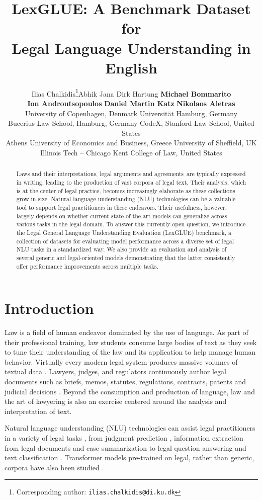 \documentclass[11pt]{article}
\title{LexGLUE: A Benchmark Dataset for\\ Legal Language Understanding in English}
\author{Ilias Chalkidis\thanks{\;\;Corresponding author: \texttt{ilias.chalkidis@di.ku.dk}}\qquad Abhik Jana \qquad Dirk Hartung \qquad \textbf{Michael Bommarito} \\ 
\textbf{Ion Androutsopoulos} \qquad \textbf{Daniel Martin Katz} \qquad \textbf{Nikolaos Aletras} \\
University of Copenhagen, Denmark \qquad 
Universität Hamburg, Germany \\
 Bucerius Law School, Hamburg, Germany \qquad
 CodeX, Stanford Law School, United States \\
 Athens University of Economics and Business, Greece \qquad
 University of Sheffield, UK \\
 Illinois Tech – Chicago Kent College of Law, United States \\
}
\date{}
\begin{document}
\maketitle
\begin{abstract}

Laws and their interpretations, legal arguments and agreements\ are typically expressed in writing, leading to the production of vast corpora of legal text. Their analysis, which is at the center of legal practice, becomes increasingly elaborate as these collections grow in size. Natural language understanding (NLU) technologies can be a valuable tool to support legal practitioners in these endeavors. Their usefulness, however, largely depends on whether current state-of-the-art models can generalize across various tasks in the legal domain. To answer this currently open question, we introduce the Legal General Language Understanding Evaluation (LexGLUE) benchmark, a collection of datasets for evaluating model performance across a diverse set of legal NLU tasks in a standardized way. We also provide an evaluation and analysis of several generic and legal-oriented models demonstrating that the latter consistently offer performance improvements across multiple tasks.
\end{abstract}

\section{Introduction}

Law is a field of human endeavor dominated by the use of language. As part of their professional training, law students consume large bodies of text as they seek to tune their understanding of the law and its application to help manage human behavior. Virtually every modern legal system produces massive volumes of textual data \cite{katz2020}.  Lawyers, judges, and regulators continuously author legal documents such as briefs, memos, statutes, regulations, contracts, patents and judicial decisions \cite{coupette2021}.  Beyond the consumption and production of language, law and the art of lawyering is also an exercise centered around the analysis and interpretation of text. 

Natural language understanding (NLU) technologies can assist legal practitioners in a variety of legal tasks \cite{chalkidis2018deep,aletras2019proceedings, aletras2020proceedings,zhong2020does,bommarito2021Lex}, from judgment prediction \cite{aletras2016predicting,sim-etal-2016-friends,katz2017general,Zhong2018,chalkidis-etal-2019-neural,Malik2021}, information extraction from legal documents \cite{chalkidis-etal-2018-obligation,Chalkidis2019neurips,chen-etal-2020-joint-entity,Hendrycks2021CUAD} and case summarization \cite{Bhattacharya2019} to legal question answering \cite{ravichander-etal-2019-question,kien-etal-2020-answering,Zhong_2020_Iteratively,Zhong2020JECQA} and text classification \cite{nallapati-manning-2008-legal,chalkidis2019Large,chalkidis2020-lmtc}. Transformer models \cite{Vaswani2017} pre-trained on legal, rather than generic, corpora have also been studied \cite{chalkidis-etal-2020-legalbert,zhengguha2021,xiao-etal-2021}.
\end{document}
